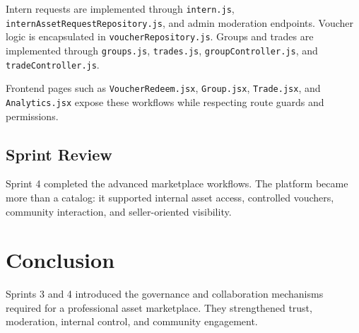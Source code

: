 Intern requests are implemented through \texttt{intern.js},
\texttt{internAssetRequestRepository.js}, and admin moderation endpoints. Voucher logic is
encapsulated in \texttt{voucherRepository.js}. Groups and trades are implemented through
\texttt{groups.js}, \texttt{trades.js}, \texttt{groupController.js}, and
\texttt{tradeController.js}.

Frontend pages such as \texttt{VoucherRedeem.jsx}, \texttt{Group.jsx}, \texttt{Trade.jsx},
and \texttt{Analytics.jsx} expose these workflows while respecting route guards and
permissions.

\subsection{Sprint Review}

Sprint 4 completed the advanced marketplace workflows. The platform became more than a
catalog: it supported internal asset access, controlled vouchers, community interaction, and
seller-oriented visibility.

\section*{Conclusion}
Sprints 3 and 4 introduced the governance and collaboration mechanisms required for a
professional asset marketplace. They strengthened trust, moderation, internal control, and
community engagement.
